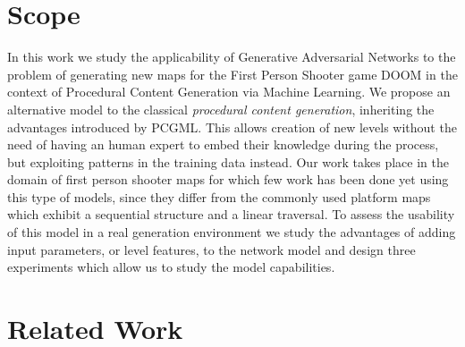 \section{Scope}
\label{sec:scope}
In this work we study the applicability of Generative Adversarial Networks to the problem of generating new maps for the First Person Shooter game DOOM in the context of Procedural Content Generation via Machine Learning. We propose an alternative model to the classical \textit{procedural content generation}, inheriting the advantages introduced by PCGML. This allows creation of new levels without the need of having an human expert to embed their knowledge during the process, but exploiting patterns in the training data instead. Our work takes place in the domain of first person shooter maps for which few work has been done yet using this type of models, since they differ from the commonly used platform maps which exhibit a sequential structure and a linear traversal. To assess the usability of this model in a real generation environment we study the advantages of adding input parameters, or level features, to the network model and design three experiments which allow us to study the model capabilities. 

\section{Related Work}
\label{sec:relatedwork}
